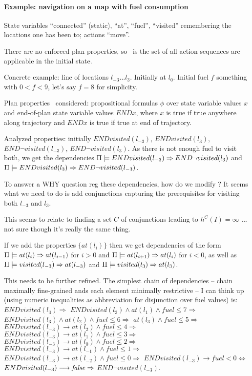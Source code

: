 \paragraph{Example: navigation on a map with fuel consumption}

State variables ``connected'' (static), ``at'', ``fuel'', ``visited''
remembering the locations one has been to; actions ``move''.

There are no enforced plan properties, so \plans\ is the set of all
action sequences are applicable in the initial state.

Concrete example: line of locations $l_{-3} ... l_3$. Initially at
$l_0$. Initial fuel $f$ something with $0 < f < 9$, let's say $f = 8$
for simplicity.

Plan properties \candprops\ considered: propositional formulas $\phi$
over state variable values $x$ and end-of-plan state variable values
$END x$, where $x$ is true if true anywhere along trajectory and $END
x$ is true if true at end of trajectory.

Analyzed properties: initially $END visited(l_{-3})$, $END
visited(l_3)$, $END \neg visited(l_{-3})$, $END \neg visited(l_3)$. As
there is not enough fuel to visit both, we get the dependencies
$\Pi \models END visited(l_{-3}) \Rightarrow END \neg visited(l_3)$ and
$\Pi \models END visited(l_3) \Rightarrow END \neg visited(l_{-3})$.

To answer a WHY question reg these dependencies, how do we modify
\props? It seems what we need to do is add conjunctions capturing the
prerequisites for visiting both $l_{-3}$ and $l_3$. 

This seems to relate to finding a set $C$ of conjunctions leading to
$h^C(I) = \infty$ ... not sure though it's really the same thing.

If we add the properties $\{at(l_i)\}$ then we get dependencies of the
form $\Pi \models at(l_i) \Rightarrow at(l_{i-1})$ for $i > 0$ and
$\Pi \models at(l_{i+1}) \Rightarrow at(l_{i})$ for $i < 0$, as well as
$\Pi \models visited(l_{-3}) \Rightarrow at(l_{-3})$ and
$\Pi \models visited(l_{3}) \Rightarrow at(l_{3})$.

This needs to be further refined. The simplest chain of dependencies
-- chain maximally fine-grained ands each element minimally
restrictive -- I can think up (using numeric inequalities as
abbreviation for disjunction over fuel values) is: $END visited(l_{3})
\Rightarrow$ $END visited(l_{3}) \wedge at(l_{1}) \wedge fuel \leq 7
\Rightarrow$ $END visited(l_{3}) \wedge at(l_{2}) \wedge fuel \leq 6
\Rightarrow$ $at(l_{3}) \wedge fuel \leq 5 \Rightarrow$ $END
visited(l_{-3}) \longrightarrow at(l_{2}) \wedge fuel \leq 4
\Rightarrow$ $END visited(l_{-3}) \longrightarrow at(l_{1}) \wedge
fuel \leq 3 \Rightarrow$ $END visited(l_{-3}) \longrightarrow
at(l_{0}) \wedge fuel \leq 2 \Rightarrow$ $END visited(l_{-3})
\longrightarrow at(l_{-1}) \wedge fuel \leq 1 \Rightarrow$ $END
visited(l_{-3}) \longrightarrow at(l_{-2}) \wedge fuel \leq 0
\Rightarrow$ $END visited(l_{-3}) \longrightarrow fuel < 0
\Leftrightarrow$ $END visited(l_{-3}) \longrightarrow \mathit{false} \Rightarrow$
$END \neg visited(l_{-3})$.

